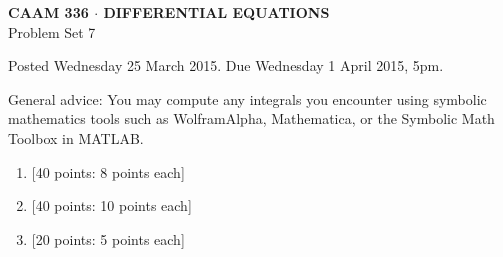 \documentclass[10pt]{article}
\begin{document}

\begin{center}
\large \textsf{\textbf{CAAM 336 $\cdot$ DIFFERENTIAL EQUATIONS}\\[0.5em]
 Problem Set 7 }
\end{center}

Posted Wednesday 25 March 2015.  Due Wednesday 1 April 2015, 5pm.



General advice: You may compute any integrals you encounter using symbolic mathematics 
tools such as WolframAlpha, Mathematica, or the Symbolic Math Toolbox in MATLAB.

\begin{enumerate}
\item {[40 points: 8 points each]}  
\item {[40 points: 10 points each]}  

\item {[20 points: 5 points each]}  


\end{enumerate}
\end{document}
